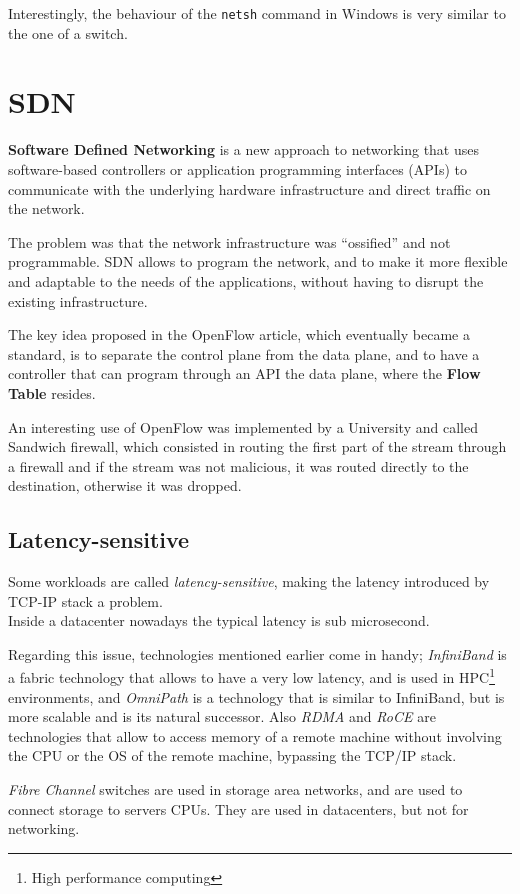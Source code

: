 Interestingly, the behaviour of the \texttt{netsh} command in Windows is very similar to the one of a switch.

\section{SDN}
\textbf{Software Defined Networking} is a new approach to networking that uses software-based controllers or application programming interfaces (APIs) to communicate with the underlying hardware infrastructure and direct traffic on the network.

The problem was that the network infrastructure was ``ossified'' and not programmable. SDN allows to program the network, and to make it more flexible and adaptable to the needs of the applications, without having to disrupt the existing infrastructure.

The key idea proposed in the OpenFlow article, which eventually became a standard, is to separate the control plane from the data plane, and to have a controller that can program through an API the data plane, where the \textbf{Flow Table} resides.

An interesting use of OpenFlow was implemented by a University and called Sandwich firewall, which consisted in routing the first part of the stream through a firewall and if the stream was not malicious, it was routed directly to the destination, otherwise it was dropped.

\subsection*{Latency-sensitive}
Some workloads are called \textit{latency-sensitive}, making the latency introduced by TCP-IP stack a problem.\\
Inside a datacenter nowadays the typical latency is sub microsecond.

Regarding this issue, technologies mentioned earlier come in handy; 
\textit{InfiniBand} is a fabric technology that allows to have a very low latency, and is used in HPC\footnote{High performance computing} environments, and \textit{OmniPath} is a technology that is similar to InfiniBand, but is more scalable and is its natural successor.
Also \textit{RDMA} and \textit{RoCE} are technologies that allow to access memory of a remote machine without involving the CPU or the OS of the remote machine, bypassing the TCP/IP stack.

\textit{Fibre Channel} switches are used in storage area networks, and are used to connect storage to servers CPUs. They are used in datacenters, but not for networking.